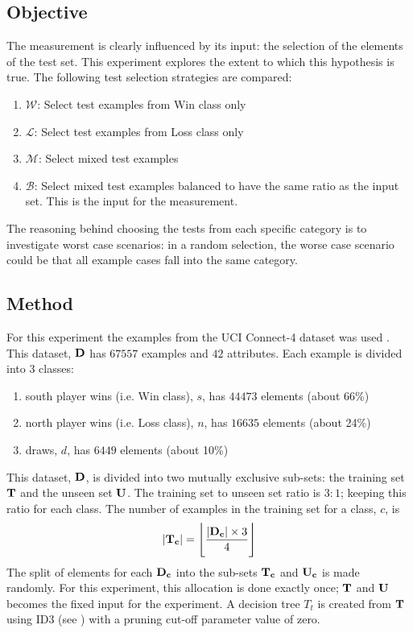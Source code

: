 \subsection{Objective}
The  measurement is clearly influenced by its input: the selection of the elements of the test set.  This experiment explores the extent to which this hypothesis is true.
The following test selection strategies are compared:
\begin{enumerate}
	\item $\mathcal W$: Select test examples from Win class only
	\item $\mathcal L$: Select test examples from Loss class only
	\item $\mathcal M$: Select mixed test examples
	\item $\mathcal B$: Select mixed test examples balanced to have the same ratio as the input set.  This is the input for the  measurement. %
\end{enumerate} 
The reasoning behind choosing the tests from each specific category is to investigate worst case scenarios: in a random selection, the worse case scenario could be that all example cases fall into the same category. 

\subsection{Method}
For this experiment the examples from the UCI Connect-4 dataset was used \cite{icu:data}. This dataset, $\myset D$ has $67557$ examples and $42$ attributes.  Each example is divided into $3$ classes:
\begin{enumerate}
	\item south player wins (i.e. Win class), $s$, has $44473$ elements (about 66\%)
	\item north player wins (i.e. Loss class), $n$, has $16635$ elements (about 24\%)
	\item draws, $d$, has $6449$ elements (about 10\%)
\end{enumerate}
This dataset, $\myset D$, is divided into two mutually exclusive sub-sets: the training set $\myset T$ and the unseen set $\myset U$. The training set to unseen set ratio is $3:1$; keeping this ratio for each class. The number of examples in the training set for a class, $c$, is \[ |\myset{T_c}| = \floor[\Bigg]{\frac{|\myset{D_c}| \times 3} {4}}\] 
The split of elements for each $\myset{D_c}$ into the sub-sets $\myset{T_c}$ and $\myset{U_c}$ is made randomly. For this experiment, this allocation is done exactly once; $\myset T$ and $\myset U$ becomes the fixed input for the experiment. A decision tree $T_t$ is created from $\myset T$ using ID3 (see ) with a pruning cut-off parameter value of zero.   

